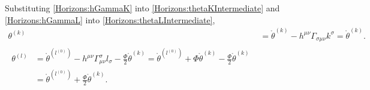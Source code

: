 Substituting \eqref{Horizons:hGammaK} into \eqref{Horizons:thetaKIntermediate} and \eqref{Horizons:hGammaL} into \eqref{Horizons:thetaLIntermediate},
\begin{align}
    \theta^{(k)} &= \mathring{\theta}^{(k)} - h^{\mu \nu}\Gamma_{\sigma \mu \nu} k^\sigma = \mathring{\theta}^{(k)}. \\
    \begin{split}
        \theta^{(l)} &= \mathring{\theta}^{(l^{(0)})} -  h^{\mu \nu} \Gamma_{\mu \nu}^\sigma l_\sigma - \frac{\Phi}{2}\mathring{\theta}^{(k)} = \mathring{\theta}^{(l^{(0)})} + \Phi\mathring{\theta}^{(k)} - \frac{\Phi}{2}\mathring{\theta}^{(k)} \\
        &= \mathring{\theta}^{(l^{(0)})} + \frac{\Phi}{2}\mathring{\theta}^{(k)}.
    \end{split}
\end{align}
